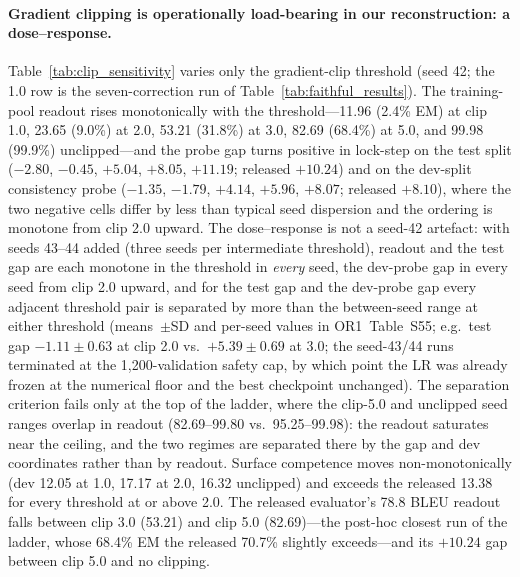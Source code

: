 \documentclass[pdflatex,sn-chicago]{sn-jnl}
\begin{document}
\paragraph{Gradient clipping is operationally load-bearing in our reconstruction: a dose--response.}
Table~\ref{tab:clip_sensitivity} varies only the gradient-clip threshold (seed 42; the 1.0 row is the seven-correction run of Table~\ref{tab:faithful_results}). The training-pool readout rises monotonically with the threshold---11.96 (2.4\% EM) at clip 1.0, 23.65 (9.0\%) at 2.0, 53.21 (31.8\%) at 3.0, 82.69 (68.4\%) at 5.0, and 99.98 (99.9\%) unclipped---and the probe gap turns positive in lock-step on the test split ($-2.80$, $-0.45$, $+5.04$, $+8.05$, $+11.19$; released $+10.24$) and on the dev-split consistency probe ($-1.35$, $-1.79$, $+4.14$, $+5.96$, $+8.07$; released $+8.10$), where the two negative cells differ by less than typical seed dispersion and the ordering is monotone from clip 2.0 upward. The dose--response is not a seed-42 artefact: with seeds 43--44 added (three seeds per intermediate threshold), readout and the test gap are each monotone in the threshold in \emph{every} seed, the dev-probe gap in every seed from clip 2.0 upward, and for the test gap and the dev-probe gap every adjacent threshold pair is separated by more than the between-seed range at either threshold (means~$\pm$SD and per-seed values in OR1~Table~S55; e.g.\ test gap $-1.11\pm0.63$ at clip 2.0 vs.\ $+5.39\pm0.69$ at 3.0; the seed-43/44 runs terminated at the 1{,}200-validation safety cap, by which point the LR was already frozen at the numerical floor and the best checkpoint unchanged). The separation criterion fails only at the top of the ladder, where the clip-5.0 and unclipped seed ranges overlap in readout (82.69--99.80 vs.\ 95.25--99.98): the readout saturates near the ceiling, and the two regimes are separated there by the gap and dev coordinates rather than by readout.
Surface competence moves non-monotonically (dev 12.05 at 1.0, 17.17 at 2.0, 16.32 unclipped) and exceeds the released 13.38 for every threshold at or above 2.0. The released evaluator's 78.8 BLEU readout falls between clip 3.0 (53.21) and clip 5.0 (82.69)---the post-hoc closest run of the ladder, whose 68.4\% EM the released 70.7\% slightly exceeds---and its $+10.24$ gap between clip 5.0 and no clipping.
\end{document}
